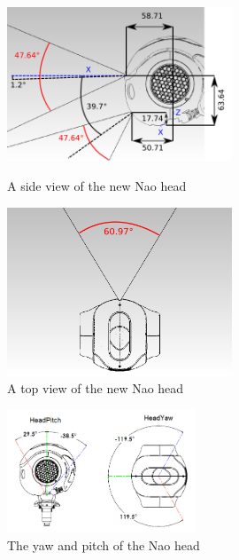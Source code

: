  \begin{figure}[ht!]
\begin{minipage}[b]{0.6\linewidth}
  \centering
    \includegraphics[width=0.6\textwidth]{../Drawings/naoHead/naoHead.jpg}
    \caption{A side view of the new Nao head \citep{NaoHead}} 
    \label{fig:nao1}
\end{minipage}
\begin{minipage}[b]{0.6\linewidth}
  \centering
    \includegraphics[width=0.6\textwidth]{../Drawings/naoHead/naoHead1.jpg}
    \caption{A top view of the new Nao head \citep{NaoHead}} 
    \label{fig:nao2}
\end{minipage}
\end{figure}

\begin{figure}[h!] 
  \centering
    \includegraphics[width=0.5\textwidth]{../Drawings/naoHead/headyawpitch.png}
    \caption{The yaw and pitch of the Nao head \citep{NaoHead}} 
    \label{fig:yawPitch}
\end{figure}


